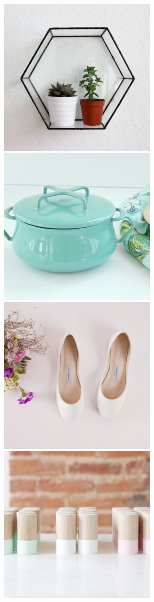 \documentclass[conference,a4paper]{IEEEtran}
\begin{document}
\begin{figure}
     \includegraphics[scale=0.15]{./figures/sample5.jpg}
    \includegraphics[scale=0.15]{./figures/sample6.jpg}
     \includegraphics[scale=0.15]{./figures/sample7.jpg}
    \includegraphics[scale=0.15]{./figures/sample8.jpg}

\end{figure}
\end{document}
